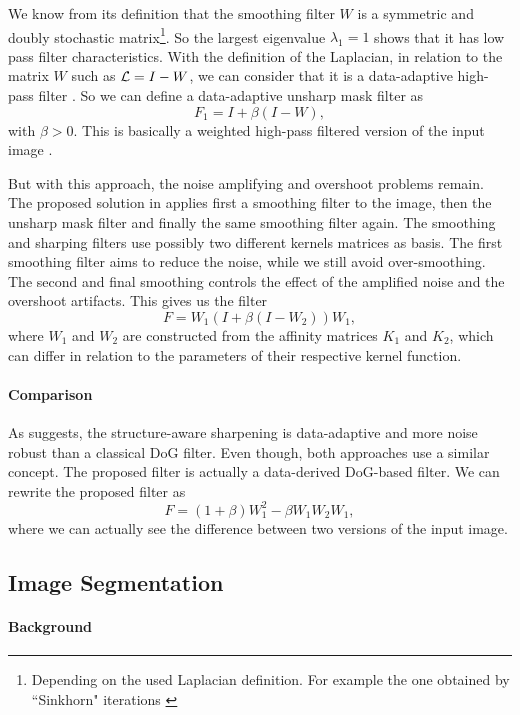 We know from its definition \cite{kheradmand_non-linear_2015} that the smoothing filter \(W\) is a symmetric and doubly stochastic matrix\footnote{Depending on the used Laplacian definition. For example the one obtained by ``Sinkhorn" iterations \cite{milanfar_symmetrizing_2013}}.
So the largest eigenvalue \(\lambda_1 = 1\) shows that it has low pass filter characteristics.
With the definition of the Laplacian, in relation to the matrix \(W\) such as \(\operatorname{\mathcal{L}} = I - W\), we can consider that it is a data-adaptive high-pass filter \cite{kheradmand_graph-based_2016}.
So we can define a data-adaptive unsharp mask filter as
\[F_1 = I + \beta (I-W),\]
with \(\beta > 0\). This is basically a weighted high-pass filtered version of the input image \cite{siam_slides_2016}.

But with this approach, the noise amplifying and overshoot problems remain.
The proposed solution in \cite{kheradmand_non-linear_2015} applies first a smoothing filter to the image, then the unsharp mask filter and finally the same smoothing filter again.
The smoothing and sharping filters use possibly two different kernels matrices as basis.
The first smoothing filter aims to reduce the noise, while we still avoid over-smoothing.
The second and final smoothing controls the effect of the amplified noise and the overshoot artifacts.
This gives us the filter
\[F = W_1(I + \beta (I - W_2))W_1,\]
where \(W_1\) and \(W_2\) are constructed from the affinity matrices \(K_1\) and \(K_2\), which can differ in relation to the parameters of their respective kernel function.

\paragraph{Comparison}

As \cite{kheradmand_non-linear_2015} suggests, the structure-aware sharpening is data-adaptive and more noise robust than a classical DoG filter.
Even though, both approaches use a similar concept.
The proposed filter is actually a data-derived DoG-based filter.
We can rewrite the proposed filter as
\[F = (1+\beta) W_1^2 - \beta W_1 W_2 W_1,\]
where we can actually see the difference between two versions of the input image.

\subsection{Image Segmentation}

\paragraph{Background}

